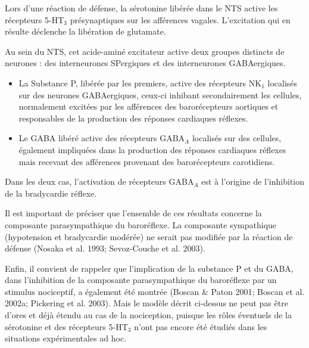 \documentclass[a4paper,12pt,twoside]{report}
\begin{document}
Lors d’une réaction de défense, la sérotonine libérée dans le NTS active les récepteurs 5-HT$_{3}$ présynaptiques sur les afférences vagales. L’excitation qui en résulte déclenche la libération de glutamate.

Au sein du NTS, cet acide-aminé excitateur active deux groupes distincts de neurones : des interneurones SPergiques et des interneurones GABAergiques.

\begin{itemize}
\item La Substance P, libérée par les premiers, active des récepteurs NK$_{1}$ localisés sur des neurones GABAergiques, ceux-ci inhibant secondairement les cellules, normalement excitées par les afférences des barorécepteurs aortiques et responsables de la production des réponses cardiaques réflexes.
\item Le GABA libéré active des récepteurs GABA$_{A}$ localisés sur des cellules, également impliquées dans la production des réponses cardiaques réflexes mais recevant des afférences provenant des barorécepteurs carotidiens.
\end{itemize}

Dans les deux cas, l’activation de récepteurs GABA$_{A}$ est à l’origine de l’inhibition de la bradycardie réflexe.

Il est important de préciser que l’ensemble de ces résultats concerne la composante parasympathique du baroréflexe. La composante sympathique (hypotension et bradycardie modérée) ne serait pas modifiée par la réaction de défense (Nosaka et al. 1993; Sevoz-Couche et al. 2003).

Enfin, il convient de rappeler que l’implication de la substance P et du GABA, dans l’inhibition de la composante parasympathique du baroréflexe par un stimulus nociceptif, a également été montrée (Boscan \& Paton 2001; Boscan et al. 2002a; Pickering et al. 2003). Mais le modèle décrit ci-dessus ne peut pas être d’ores et déjà étendu au cas de la nociception, puisque les rôles éventuels de la sérotonine et des récepteurs 5-HT$_{3}$ n’ont pas encore été étudiés dans les situations expérimentales ad hoc.

\cleardoublepage

\fancyhf{} %
\fancyfoot[C]{\bfseries -\thepage-}
\fancyhead[RO]{\bfseries\rightmark}
\renewcommand{\headrulewidth}{1pt}
\renewcommand{\footrulewidth}{1pt}
\addtolength{\headheight}{1pt} %
\end{document}
